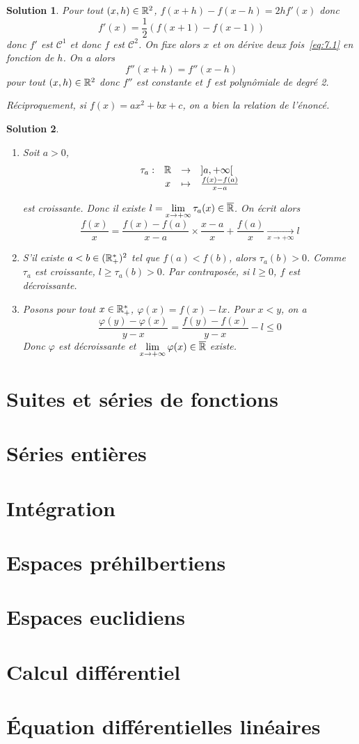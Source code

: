 \documentclass[12pt]{article}
\newtheorem{solution}{Solution}[section]
\theoremstyle{remark}
\newcommand{\function}[5]{
	$$
	\begin{array}{rccl}
		#1: & #2 & \to & #3 \\
		& #4 & \mapsto & #5
	\end{array}
	$$
}
\numberwithin{equation}{section}
\begin{document}
\begin{solution}
	Pour tout $(x,h)\in\mathbb{R}^{2}$, $f(x+h)-f(x-h)=2hf'(x)$ donc 
	\begin{equation}
		\label{eq:7.1}
		f'(x)=\frac{1}{2}(f(x+1)-f(x-1))
	\end{equation}
	donc $f'$ est $\mathcal{C}^{1}$ et donc $f$ est $\mathcal{C}^{2}$. On fixe alors $x$ et on dérive deux fois~\eqref{eq:7.1} en fonction de $h$. On a alors
	$$f''(x+h)=f''(x-h)$$
	pour tout $(x,h)\in\mathbb{R}^{2}$ donc $f''$ est constante et $f$ est polynômiale de degré 2.

	Réciproquement, si $f(x)=ax^{2}+bx+c$, on a bien la relation de l'énoncé.
\end{solution}

\begin{solution}
	\phantom{}
	\begin{enumerate}
		\item Soit $a>0$, \function{\tau_{a}}{\R}{]a,+\infty[}{x}{\frac{f(x)-f(a)}{x-a}}
		est croissante. Donc il existe $l=\lim\limits_{x\to+\infty}\tau_{a}(x)\in\overline{\mathbb{R}}$. On écrit alors 
		$$\frac{f(x)}{x}=\frac{f(x)-f(a)}{x-a}\times \frac{x-a}{x}+\frac{f(a)}{x}\xrightarrow[x\to+\infty]{}l$$

		\item S'il existe $a<b\in(\mathbb{R}_{+}^{*})^{2}$ tel que $f(a)<f(b)$, alors $\tau_{a}(b)>0$. Comme $\tau_{a}$ est croissante, $l\geqslant\tau_{a}(b)>0$. Par contraposée, si $l\geqslant0$, $f$ est décroissante.
		\item Posons pour tout $x\in\mathbb{R}_{+}^{*}$, $\varphi(x)=f(x)-lx$. Pour $x<y$, on a 
		$$\frac{\varphi(y)-\varphi(x)}{y-x}=\frac{f(y)-f(x)}{y-x}-l\leqslant0$$
		Donc $\varphi$ est décroissante et $\lim\limits_{x\to+\infty}\varphi(x)\in\overline{\mathbb{R}}$ existe.
	\end{enumerate}
\end{solution}

\section{Suites et séries de fonctions}
\section{Séries entières}
\section{Intégration}
\section{Espaces préhilbertiens}
\section{Espaces euclidiens}
\section{Calcul différentiel}
\section{\'Equation différentielles linéaires}
\end{document}
